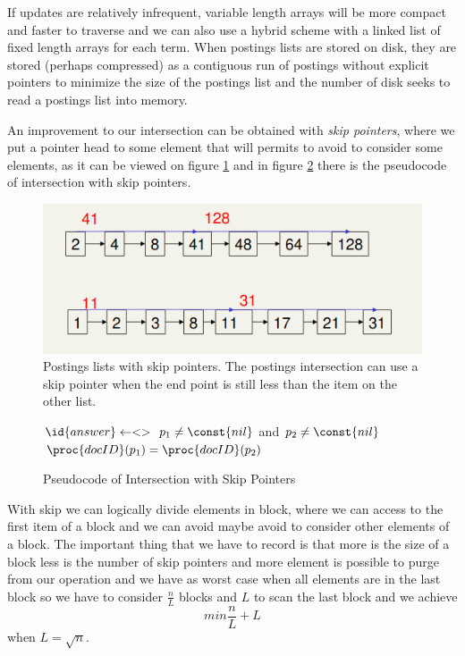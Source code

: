 If updates are relatively infrequent, variable
length arrays will be more compact and faster to traverse and we can also use a
hybrid scheme with a linked list of fixed length arrays for each term.\newline
When postings lists are stored on disk, they are stored (perhaps compressed) as a
contiguous run of postings without explicit pointers 
to minimize the size of the postings list and the number of disk seeks to read
a postings list into memory.

An improvement to our intersection can be obtained with \emph{skip pointers}, where we put a pointer 
head to some element that will permits to avoid to consider some elements, as it can be viewed on 
figure \ref{img:skip} and in figure \ref{alg:skip} there is the pseudocode of intersection with skip pointers.


\begin{figure}
    \caption{Postings lists with skip pointers. The postings intersection can use a skip pointer
             when the end point is still less than the item on the other list.}
    \label{img:skip}
    \includegraphics[width=\textwidth]{Images/skip}
\end{figure}

\begin{figure}
    \caption{Pseudocode of Intersection with Skip Pointers}
    \label{alg:skip}
    \begin{codebox}
	\li $\id{answer} \gets <>$
	\li \While $p_1 \neq \const{nil}$ and $p_2 \neq \const{nil}$
	    \Do
	\li        \If $\proc{docID}(p_1) = \proc{docID}(p_2)$
	    	   \Then
	\li 	          
    \end{codebox}
\end{figure}
With skip we can logically divide elements in block, where we can access to the first item of a block and we 
can avoid maybe avoid to consider other elements of a block.\newline
The important thing that we have to record is that more is the size of a block less is the number of skip pointers 
and more element is possible to purge from our operation and we have as worst case when all elements are 
in the last block so we have to consider $\frac{n}{L}$ blocks and $L$ to scan the last block and we achieve 
\[ min \frac{n}{L} + L \]
when $L = \sqrt{n}$.

